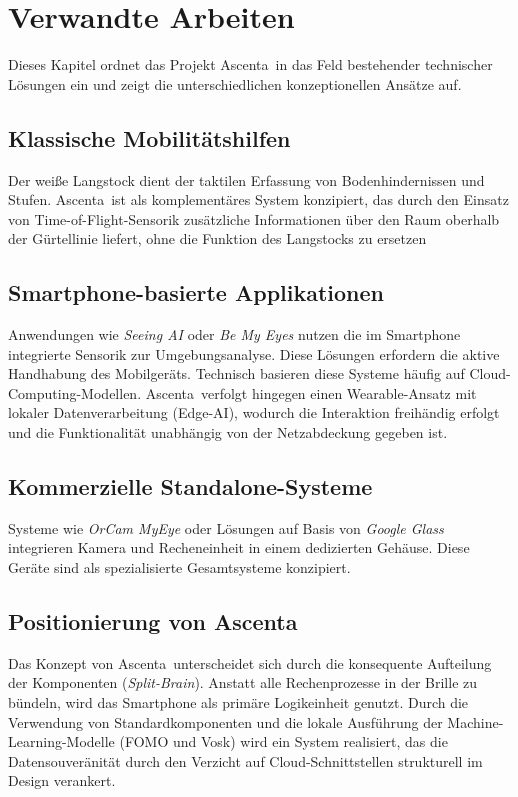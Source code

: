\chapter{Verwandte Arbeiten}
\label{ch:related_work}

Dieses Kapitel ordnet das Projekt \glqq Ascenta\grqq\ in das Feld bestehender technischer Lösungen ein und zeigt die unterschiedlichen konzeptionellen Ansätze auf.

\section{Klassische Mobilitätshilfen}
Der weiße Langstock dient der taktilen Erfassung von Bodenhindernissen und Stufen. \glqq Ascenta\grqq\ ist als komplementäres System konzipiert, das durch den Einsatz von Time-of-Flight-Sensorik zusätzliche Informationen über den Raum oberhalb der Gürtellinie liefert, ohne die Funktion des Langstocks zu ersetzen

\section{Smartphone-basierte Applikationen}
Anwendungen wie \textit{Seeing AI} oder \textit{Be My Eyes} nutzen die im Smartphone integrierte Sensorik zur Umgebungsanalyse. Diese Lösungen erfordern die aktive Handhabung des Mobilgeräts. Technisch basieren diese Systeme häufig auf Cloud-Computing-Modellen. \glqq Ascenta\grqq\ verfolgt hingegen einen Wearable-Ansatz mit lokaler Datenverarbeitung (Edge-AI), wodurch die Interaktion freihändig erfolgt und die Funktionalität unabhängig von der Netzabdeckung gegeben ist.

\section{Kommerzielle Standalone-Systeme}
Systeme wie \textit{OrCam MyEye} oder Lösungen auf Basis von \textit{Google Glass} integrieren Kamera und Recheneinheit in einem dedizierten Gehäuse. Diese Geräte sind als spezialisierte Gesamtsysteme konzipiert.

\section{Positionierung von Ascenta}
Das Konzept von \glqq Ascenta\grqq\ unterscheidet sich durch die konsequente Aufteilung der Komponenten (\textit{Split-Brain}). Anstatt alle Rechenprozesse in der Brille zu bündeln, wird das Smartphone als primäre Logikeinheit genutzt. Durch die Verwendung von Standardkomponenten und die lokale Ausführung der Machine-Learning-Modelle (FOMO und Vosk) wird ein System realisiert, das die Datensouveränität durch den Verzicht auf Cloud-Schnittstellen strukturell im Design verankert.